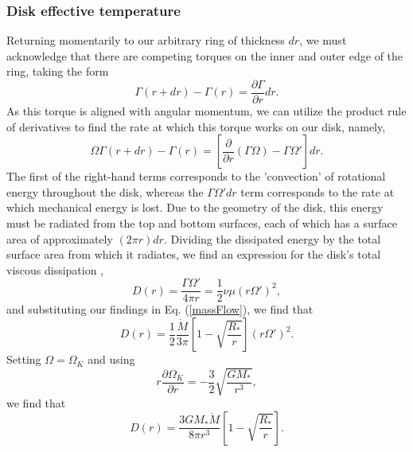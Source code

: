\documentclass[aps,pra,twocolumn]{revtex4-1}
\begin{document}
\subsubsection{\label{section 2.2.2} Disk effective temperature}
Returning momentarily to our arbitrary ring of thickness $dr$, we must acknowledge that there are competing torques on the inner and outer edge of the ring, taking the form
\begin{equation}
\Gamma(r + dr) - \Gamma(r) = \frac{\partial \Gamma}{\partial r}dr \nonumber.
\end{equation}
As this torque is aligned with angular momentum, we can utilize the product rule of derivatives to find the rate at which this torque works on our disk, namely,
\begin{equation}
\Omega\Gamma(r + dr) - \Gamma(r) = \left[ \frac{\partial}{\partial r}(\Gamma\Omega) - \Gamma\Omega' \right]dr.
\end{equation}
The first of the right-hand terms corresponds to the 'convection' of rotational energy throughout the disk, whereas the $\Gamma\Omega' dr$ term corresponds to the rate at which mechanical energy is lost.  Due to the geometry of the disk, this energy must be radiated from the top and bottom surfaces, each of which has a surface area of approximately $(2\pi r)dr$. Dividing the dissipated energy by the total surface area from which it radiates, we find an expression for the disk's total viscous dissipation \cite{king2002},
\begin{equation}
D(r) = \frac{\Gamma \Omega'}{4\pi r}= \frac{1}{2}\nu \mu (r\Omega')^2,
\end{equation}
and substituting our findings in Eq. (\ref{massFlow}), we find that
\begin{equation}
D(r) =\frac{1}{2}\frac{\dot{M}}{3\pi}\left[ 1 - \sqrt{\frac{R_*}{r}} \right] (r\Omega')^2. \nonumber
\end{equation}
Setting $\Omega = \Omega_K$ and using
\begin{equation}
r\frac{\partial\Omega_K}{\partial r} = -\frac{3}{2}\sqrt{\frac{G M_*}{r^3}},
\end{equation}
we find that
\begin{equation}
D(r) = \frac{3GM_*\dot{M}}{8\pi r^3}\left[ 1 - \sqrt{\frac{R_*}{r}} \right].
\end{equation}
\end{document}

